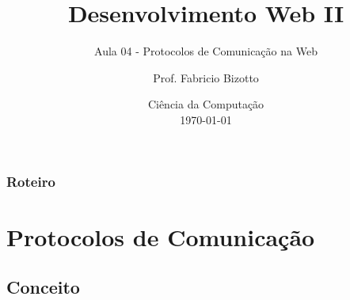 \documentclass[
	10pt, %
	t, %
]{beamer}
\title[DesWebII]{Desenvolvimento Web II} %
\subtitle{Aula 04 - Protocolos de Comunicação na Web} %
\author[Fabricio Bizotto]{Prof. Fabricio Bizotto} %
\institute[IFC]{Instituto Federal Catarinense \\ \smallskip \textit{fabricio.bizotto@ifc.edu.br}} %
\date[\today]{Ciência da Computação \\ \today} %
\begin{document}

\begin{frame}
	\titlepage %
\end{frame}


\begin{frame}
	\frametitle{Roteiro} %
	
	\tableofcontents %
\end{frame}


\section{Protocolos de Comunicação} %


\subsection{Conceito}
\end{document}
